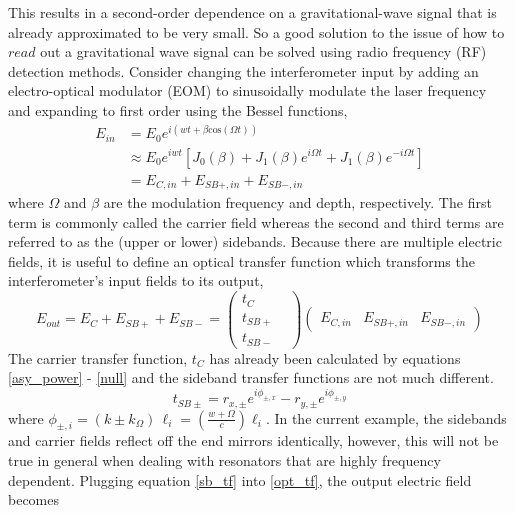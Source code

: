 		This results in a second-order dependence on a gravitational-wave signal that is already approximated to be very small.  
		So a good solution to the issue of how to $read$ out a gravitational wave signal can be solved using radio frequency (RF) detection methods. Consider changing the interferometer input by adding an electro-optical modulator (EOM) to sinusoidally modulate the laser frequency and expanding to first order using the Bessel functions,
			\begin{equation}\label{modE}
			\begin{aligned}
			E_{in} 	&= E_{0} e^{i(wt + \beta \text{cos} (\Omega t))} \\
					&\approx E_0 e^{iwt} [J_0(\beta) + J_1(\beta) e^{i \Omega t} + J_1(\beta) e^{-i \Omega t}] \\
					&= E_{C,in} + E_{SB+,in} + E_{SB-,in}
			\end{aligned}
			\end{equation}
		where $\Omega$ and $\beta$ are the modulation frequency and depth, respectively. The first term is commonly called the carrier field whereas the second and third terms are referred to as the (upper or lower) sidebands.  Because there are multiple electric fields, it is useful to define an optical transfer function which transforms the interferometer's input fields to its output,
		\begin{equation}\label{opt_tf}
		E_{out} = E_{C} + E_{SB+} + E_{SB-} = 
		\begin{pmatrix}
			t_{C} 	&   
		\\ 	t_{SB+} &
		\\ 	t_{SB-} &
		\end{pmatrix}
		\begin{pmatrix}
		E_{C,in} &    E_{SB+,in}    &  E_{SB-,in}     
		\end{pmatrix}
		\end{equation}
		The carrier transfer function, $t_{C}$ has already been calculated by equations \ref{asy_power} - \ref{null} and the sideband transfer functions are not much different.
		\begin{equation}\label{sb_tf}
		t_{SB\pm} = r_{x,\pm}  e^{i\phi_{\pm,x}} - r_{y,\pm}  e^{i\phi_{\pm,y}}
		\end{equation}
		where $\phi_{\pm,i} = (k \pm k_{\Omega}) \, \ell_{i} = (\frac{w+\Omega}{c} ) \ell_{i}$. In the current example, the sidebands and carrier fields reflect off the end mirrors identically, however, this will not be true in general when dealing with resonators that are highly frequency dependent.  Plugging equation \ref{sb_tf} into \ref{opt_tf}, the output electric field becomes 
